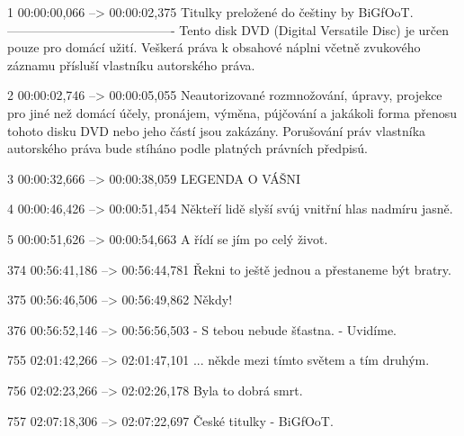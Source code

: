 \begin{subexam}
1
00:00:00,066 --> 00:00:02,375
Titulky preložené do češtiny by BiGfOoT.
----------------------------------------
Tento disk DVD (Digital Versatile Disc)
je určen pouze pro domácí užití.
Veškerá práva k obsahové náplni včetně
zvukového záznamu přísluší vlastníku
autorského práva.

2
00:00:02,746 --> 00:00:05,055
Neautorizované rozmnožování,
úpravy, projekce pro jiné než domácí
účely, pronájem, výměna, pújčování a
jakákoli forma přenosu tohoto disku
DVD nebo jeho částí jsou zakázány.
Porušování práv vlastníka autorského
práva bude stíháno podle platných
právních předpisú.

3
00:00:32,666 --> 00:00:38,059
LEGENDA O VÁŠNI

4
00:00:46,426 --> 00:00:51,454
Někteří lidě slyší svúj
vnitřní hlas nadmíru jasně.

5
00:00:51,626 --> 00:00:54,663
A řídí se jím po celý život.

374
00:56:41,186 --> 00:56:44,781
Řekni to ještě jednou
a přestaneme být bratry.

375
00:56:46,506 --> 00:56:49,862
Někdy!

376
00:56:52,146 --> 00:56:56,503
- S tebou nebude šťastna.
- Uvidíme.

755
02:01:42,266 --> 02:01:47,101
... někde mezi tímto světem
a tím druhým.

756
02:02:23,266 --> 02:02:26,178
Byla to dobrá smrt.

757
02:07:18,306 --> 02:07:22,697
České titulky - BiGfOoT.
\end{subexam}


